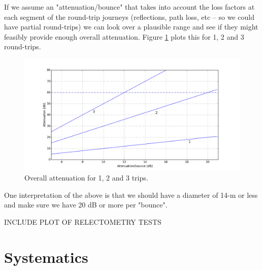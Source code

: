 \documentclass[11pt]{article}
\begin{document}
If we assume an "attenuation/bounce" that takes into account the loss factors at each segment of the round-trip journeys (reflections, path loss, etc -- so we could have partial round-trips) we can look over a plausible range and see if they might feasibly provide enough overall attenuation.  Figure \ref{fig:bounces} plots this for 1, 2 and 3 round-trips.
\begin{figure}[h]
\centering
\includegraphics[width=1.0\textwidth]{bounces.png}
\caption{Overall attenuation for 1, 2 and 3 trips.}
\label{fig:bounces}
\end{figure}

One interpretation of the above is that we should have a diameter of 14-m or less and make sure we have 20 dB or more per "bounce".  

INCLUDE PLOT OF RELECTOMETRY TESTS

\section{Systematics}
\end{document}
